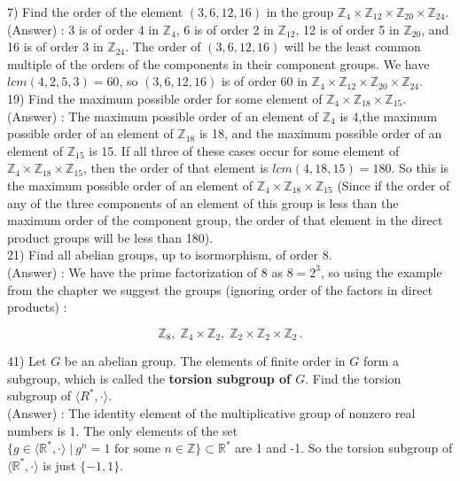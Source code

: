 \documentclass[12pt, letterpaper]{article}
\begin{document}
7) Find the order of the element $(3,6,12,16)$ in the group $\mathbb{Z}_4 \times \mathbb{Z}_{12} \times \mathbb{Z}_{20} \times \mathbb{Z}_{24}$. \\

(Answer) : 3 is of order 4 in $\mathbb{Z}_4$, 6 is of order 2 in $\mathbb{Z}_{12}$, 12 is of order 5 in $\mathbb{Z}_{20}$, and 16 is of order 3 in $\mathbb{Z}_{24}$. The order of $(3,6,12,16)$ will be the least common multiple of the orders of the components in their component groups. We have $lcm(4,2,5,3) = 60$, so $(3,6,12,16)$ is of order 60 in $\mathbb{Z}_4 \times \mathbb{Z}_{12} \times \mathbb{Z}_{20} \times \mathbb{Z}_{24}$. \\

19) Find the maximum possible order for some element of $\mathbb{Z}_4 \times \mathbb{Z}_{18} \times \mathbb{Z}_{15}$. \\

(Answer) : The maximum possible order of an element of $\mathbb{Z}_4$ is 4,the maximum possible order of an element of $\mathbb{Z}_{18}$ is 18, and the maximum possible order of an element of $\mathbb{Z}_{15}$ is 15. If all three of these cases occur for some element of $\mathbb{Z}_4 \times \mathbb{Z}_{18} \times \mathbb{Z}_{15}$, then the order of that element is $lcm(4,18,15) = 180$. So this is the maximum possible order of an element of $\mathbb{Z}_4 \times \mathbb{Z}_{18} \times \mathbb{Z}_{15}$ (Since if the order of any of the three components of an element of this group is less than the maximum order of the component group, the order of that element in the direct product groups will be less than 180). \\

21) Find all abelian groups, up to isormorphism, of order 8. \\

(Answer) : We have the prime factorization of 8 as $8 = 2^3$, so using the example from the chapter we suggest the groups (ignoring order of the factors in direct products) : 

$$\mathbb{Z}_8, \; \mathbb{Z}_4 \times \mathbb{Z}_2, \; \mathbb{Z}_2 \times \mathbb{Z}_2 \times \mathbb{Z}_2\,.$$

41) Let $G$ be an abelian group. The elements of finite order in $G$ form a subgroup, which is called the {\bf torsion subgroup of $G$}. Find the torsion subgroup of $\langle R^*, \cdot \rangle$. \\

(Answer) : The identity element of the multiplicative group of nonzero real numbers is 1. The only elements of the set $\{g \in \langle \mathbb{R}^*,\cdot \rangle \; | \: g^n = 1 \mbox{ for some } n \in \mathbb{Z} \} \subset \mathbb{R}^*$ are 1 and -1. So the torsion subgroup of $\langle \mathbb{R}^*, \cdot \rangle$ is just $\{-1,1\}$. \\
\end{document}
